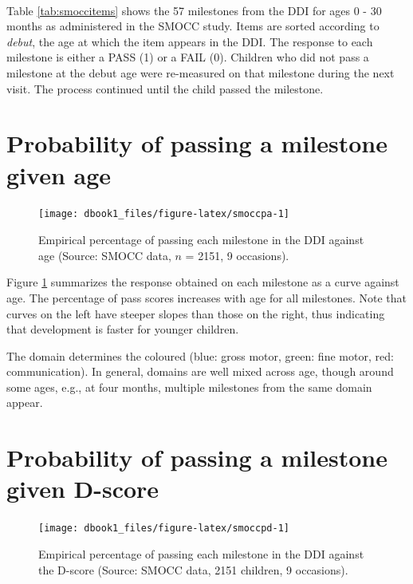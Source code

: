 \documentclass[
]{book}
\begin{document}
~

Table \ref{tab:smoccitems} shows the 57 milestones from the DDI for ages 0 - 30 months as administered in the SMOCC study. Items are sorted according to \emph{debut}, the age at which the item appears in the DDI. The response to each milestone is either a PASS (1) or a FAIL (0). Children who did not pass a milestone at the debut age were re-measured on that milestone during the next visit. The process continued until the child passed the milestone.

\hypertarget{sec:probage}{%
\section{Probability of passing a milestone given age}\label{sec:probage}}

\begin{figure}

{\centering \texttt{[image: dbook1\_files/figure-latex/smoccpa-1]} 

}

\caption{Empirical percentage of passing each milestone in the DDI against age (Source: SMOCC data, \(n\) = 2151, 9 occasions).}\label{fig:smoccpa}
\end{figure}



Figure \ref{fig:smoccpa} summarizes the response obtained on each milestone as a curve against age. The percentage of pass scores increases with age for all milestones. Note that curves on the left have steeper slopes than those on the right, thus indicating that development is faster for younger children.

The domain determines the coloured (blue: gross motor, green: fine motor, red: communication). In general, domains are well mixed across age, though around some ages, e.g., at four months, multiple milestones from the same domain appear.

\hypertarget{sec:probd}{%
\section{Probability of passing a milestone given D-score}\label{sec:probd}}

\begin{figure}

{\centering \texttt{[image: dbook1\_files/figure-latex/smoccpd-1]} 

}

\caption{Empirical percentage of passing each milestone in the DDI against the D-score (Source: SMOCC data, 2151 children, 9 occasions).}\label{fig:smoccpd}
\end{figure}
\end{document}
